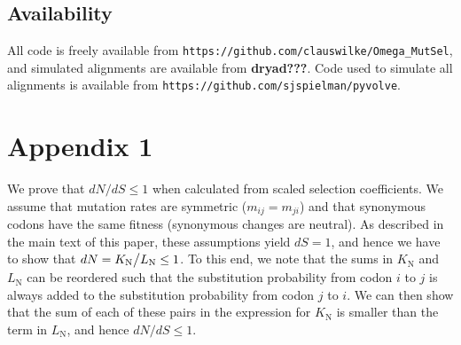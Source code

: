 \documentclass[11pt]{article}
\begin{document}
\subsection*{Availability}
All code is freely available from \texttt{https://github.com/clauswilke/Omega\_MutSel}, and simulated alignments are available from \textbf{dryad???}. Code used to simulate all alignments is available from \texttt{https://github.com/sjspielman/pyvolve}.



\section*{Appendix 1}
We prove that $dN/dS \leq 1$ when calculated from scaled selection coefficients. We assume that mutation rates are symmetric ($m_{ij} = m_{ji}$) and that synonymous codons have the same fitness (synonymous changes are neutral). As described in the main text of this paper, these assumptions yield $dS = 1$, and hence we have to show that $dN = K_\text{N}\big{/}L_\text{N} \leq 1$. To this end, we note that the sums in $K_\text{N}$ and $L_\text{N}$ can be reordered such that the substitution probability from codon $i$ to $j$ is always added to the substitution probability from codon $j$ to $i$. We can then show that the sum of each of these pairs in the expression for $K_\text{N}$ is smaller than the term in $L_\text{N}$, and hence $dN/dS \leq 1$.
\end{document}
